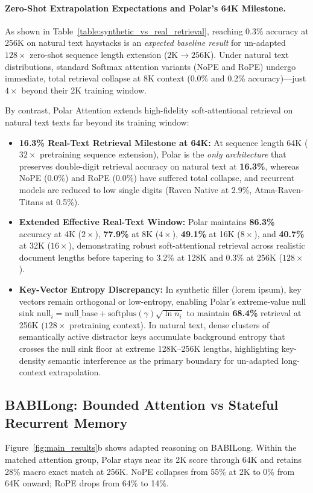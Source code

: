 \documentclass{article} %
\begin{document}
\paragraph{Zero-Shot Extrapolation Expectations and Polar's 64K Milestone.}
As shown in Table~\ref{table:synthetic_vs_real_retrieval}, reaching 0.3\% accuracy at 256K on natural text haystacks is an \emph{expected baseline result} for un-adapted $128\times$ zero-shot sequence length extension ($2\text{K} \to 256\text{K}$). Under natural text distributions, standard Softmax attention variants (NoPE and RoPE) undergo immediate, total retrieval collapse at 8K context (0.0\% and 0.2\% accuracy)—just $4\times$ beyond their 2K training window.

By contrast, Polar Attention extends high-fidelity soft-attentional retrieval on natural text texts far beyond its training window:
\begin{itemize}
    \item \textbf{16.3\% Real-Text Retrieval Milestone at 64K:} At sequence length 64K ($32\times$ pretraining sequence extension), Polar is the \emph{only architecture} that preserves double-digit retrieval accuracy on natural text at \textbf{16.3\%}, whereas NoPE (0.0\%) and RoPE (0.0\%) have suffered total collapse, and recurrent models are reduced to low single digits (Raven Native at 2.9\%, Atma-Raven-Titans at 0.5\%).
    \item \textbf{Extended Effective Real-Text Window:} Polar maintains \textbf{86.3\%} accuracy at 4K ($2\times$), \textbf{77.9\%} at 8K ($4\times$), \textbf{49.1\%} at 16K ($8\times$), and \textbf{40.7\%} at 32K ($16\times$), demonstrating robust soft-attentional retrieval across realistic document lengths before tapering to 3.2\% at 128K and 0.3\% at 256K ($128\times$).
    \item \textbf{Key-Vector Entropy Discrepancy:} In synthetic filler (lorem ipsum), key vectors remain orthogonal or low-entropy, enabling Polar's extreme-value null sink $\mathrm{null}_i = \mathrm{null\_base} + \mathrm{softplus}(\gamma)\sqrt{\ln n_i}$ to maintain \textbf{68.4\%} retrieval at 256K ($128\times$ pretraining context). In natural text, dense clusters of semantically active distractor keys accumulate background entropy that crosses the null sink floor at extreme 128K--256K lengths, highlighting key-density semantic interference as the primary boundary for un-adapted long-context extrapolation.
\end{itemize}

\subsection{BABILong: Bounded Attention vs Stateful Recurrent Memory}
Figure~\ref{fig:main_results}b shows adapted reasoning on BABILong. Within the matched attention group, Polar stays near its 2K score through 64K and retains 28\% macro exact match at 256K. NoPE collapses from 55\% at 2K to 0\% from 64K onward; RoPE drops from 64\% to 14\%.
\end{document}
